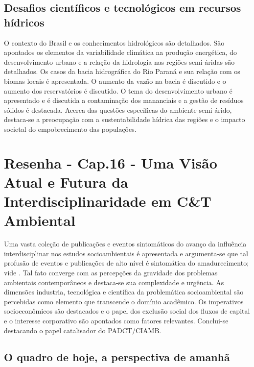 \documentclass[
   article,       %
   12pt,          %
   oneside,       %
   a4paper,       %
   english,       %
   brazil,           %
   sumario=tradicional
   ]{abntex2}
\begin{document}
\subsection{Desafios científicos e tecnológicos em recursos hídricos}

O contexto do Brasil e os conhecimentos hidrológicos são detalhados. São apontados os elementos da variabilidade climática na produção energética, do desenvolvimento urbano e a relação da hidrologia nas regiões semi-áridas são detalhados. Os casos da bacia hidrográfica do Rio Paraná e sua relação com os biomas locais é apresentada. O aumento da vazão na bacia é discutido e o aumento dos reservatórios é discutido. O tema do desenvolvimento urbano é apresentado e é discutida a contaminação dos mananciais e a gestão de resíduos sólidos é destacada. Acerca das questões específicas do ambiente semi-árido, destaca-se a preocupação com a sustentabilidade hídrica das regiões e o impacto societal do empobrecimento das populações.




\newpage

\section{Resenha - Cap.16 - Uma Visão Atual e Futura da Interdisciplinaridade
em C\&T Ambiental}


Uma vasta coleção de publicações e eventos sintomáticos do avanço da influência interdisciplinar nos estudos socioambientais é apresentada e argumenta-se que tal profusão de eventos e publicações de alto nível é sintomática do amadurecimento; vide \cite{Interdisciplinaridade_Futura} . Tal fato converge com as percepções da gravidade dos problemas ambientais contemporâneos e destaca-se sua complexidade e urgência. As dimensões industria, tecnológica e científica da problemática socioambiental são percebidas como elemento que transcende o domínio acadêmico. Os imperativos socioeconômicos são destacados e o papel dos exclusão social dos fluxos de capital e o interesse corporativo são apontados como fatores relevantes. Conclui-se destacando o papel catalisador do PADCT/CIAMB.


\subsection{O quadro de hoje, a perspectiva de amanhã}
\end{document}
